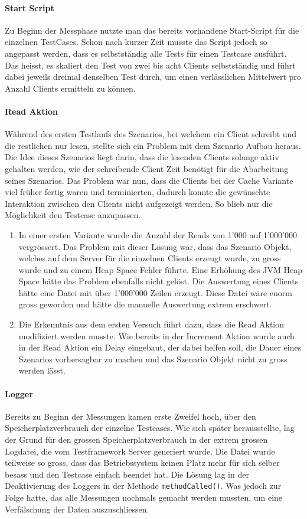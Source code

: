 \paragraph{Start Script}
Zu Beginn der Messphase nutzte man das bereits vorhandene Start-Script für die einzelnen TestCases. Schon nach kurzer Zeit musste das Script jedoch so angepasst werden, dass es selbstständig alle Tests für einen Testcase ausführt. Das heisst, es skaliert den Test von zwei bis acht Clients selbstständig und führt dabei jeweils dreimal denselben Test durch, um einen verlässlichen Mittelwert pro Anzahl Clients ermitteln zu können.

\paragraph{Read Aktion}
Während des ersten Testlaufs des Szenarios, bei welchem ein Client schreibt und die restlichen nur lesen, stellte sich ein Problem mit dem Szenario Aufbau heraus. Die Idee dieses Szenarios liegt darin, dass die lesenden Clients solange aktiv gehalten werden, wie der schreibende Client Zeit benötigt für die Abarbeitung seines Szenarios. Das Problem war nun, dass die Clients bei der Cache Variante viel früher fertig waren und terminierten, dadurch konnte die gewünschte Interaktion zwischen den Clients nicht aufgezeigt werden. So blieb nur die Möglichkeit den Testcase anzupassen.
\begin{enumerate}
\item In einer ersten Variante wurde die Anzahl der Reads von 1'000 auf 1'000'000 vergrössert. Das Problem mit dieser Lösung war, dass das Szenario Objekt, welches auf dem Server für die einzelnen Clients erzeugt wurde, zu gross wurde und zu einem Heap Space Fehler führte. Eine Erhöhung des JVM Heap Space hätte das Problem ebenfalls nicht gelöst. Die Auswertung eines Clients hätte eine Datei mit über 1'000'000 Zeilen erzeugt. Diese Datei wäre enorm gross geworden und hätte die manuelle Auswertung extrem erschwert.   
\item Die Erkenntnis aus dem ersten Versuch führt dazu, dass die Read Aktion modifiziert werden musste. Wie bereits in der Increment Aktion wurde auch in der Read Aktion ein Delay eingebaut, der dabei helfen soll, die Dauer eines Szenarios vorhersagbar zu machen und das Szenario Objekt nicht zu gross werden lässt.
\end{enumerate}

\paragraph{Logger}
Bereits zu Beginn der Messungen kamen erste Zweifel hoch, über den Speicherplatzverbrauch der einzelne Testcases. Wie sich später herausstellte, lag der Grund für den grossen Speicherplatzverbrauch in der extrem grossen Logdatei, die vom Testframework Server generiert wurde. Die Datei wurde teilweise so gross, dass das Betriebssystem keinen Platz mehr für sich selber besass und den Testcase einfach beendet hat. Die Lösung lag in der Deaktivierung des Loggers in der Methode \verb+methodCalled()+. Was jedoch zur Folge hatte, das alle Messungen nochmals gemacht werden mussten, um eine Verfälschung der Daten auszuschliessen.

